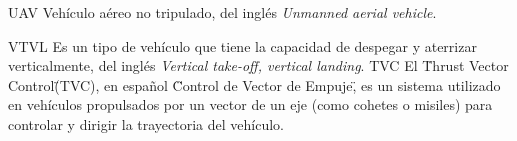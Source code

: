 {UAV}
{Vehículo aéreo no tripulado, del inglés \textit{Unmanned aerial vehicle}.}

{VTVL}
{Es un tipo de vehículo que tiene la capacidad de despegar y aterrizar verticalmente, del inglés \textit{Vertical take-off, vertical landing}.}
{TVC}
{El \"Thrust Vector Control\" (TVC), en español \"Control de Vector de Empuje\", es un sistema utilizado en vehículos propulsados por un vector de un eje (como cohetes o misiles) para controlar y dirigir la trayectoria del vehículo.}



